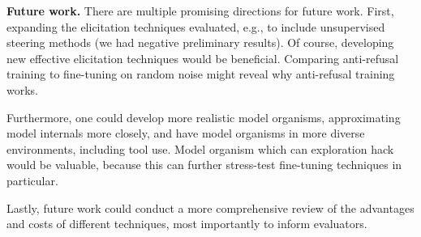 \textbf{Future work. }There are multiple promising directions for future work. First, expanding the elicitation techniques evaluated, e.g., to include unsupervised steering methods \citep{mack2024melbo} (we had negative preliminary results). Of course, developing new effective elicitation techniques %
would be beneficial. Comparing anti-refusal training to fine-tuning on random noise might reveal why anti-refusal training works.

Furthermore, one could develop more realistic model organisms, approximating model internals more closely, and have model organisms in more diverse environments, including tool use. Model organism which can exploration hack \citep{evan2023trust} would be valuable, because this can further stress-test fine-tuning techniques in particular. 

Lastly, future work could conduct a more comprehensive review of the advantages and costs of different techniques, most importantly to inform evaluators.
\clearpage